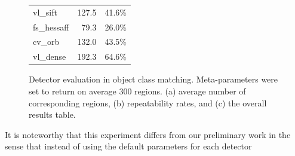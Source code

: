 \documentclass[review]{elsarticle}
\begin{document}
\begin{figure}[h]
\begin{center}
{\begin{tabular}{l r r}
{vl\_sift}       &  127.5 & 41.6\%\\
{fs\_hessaff}    &  79.3 & 26.0\%\\
{cv\_orb}        & 132.0 & 43.5\%\\
{vl\_dense}       & 192.3 & 64.6\%\\
\bottomrule
\end{tabular}}
\caption{Detector evaluation in object class matching. Meta-parameters were set to return
on average 300 regions.
(a) average number of corresponding regions,
(b) repeatability rates,
and (c) the overall results table.\label{fig:results1}}
\end{center}
\end{figure}
%
It is noteworthy that this experiment differs from our preliminary work
in the sense that instead of using the default parameters for each detector
\end{document}
